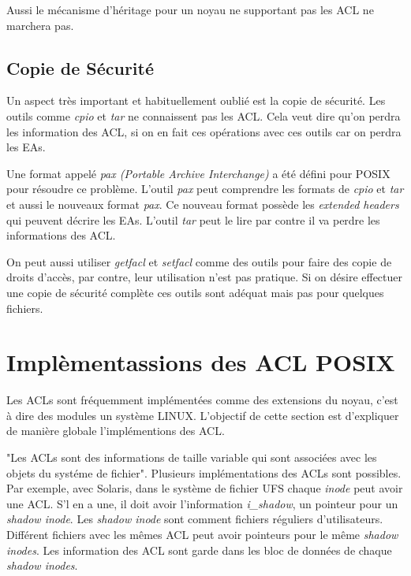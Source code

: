 \documentclass{article}
\begin{document}
Aussi le mécanisme d'héritage pour un noyau ne supportant pas les ACL ne marchera pas. 

\subsection{Copie de Sécurité}

Un aspect très important et habituellement oublié est la copie de sécurité. Les outils comme \emph{cpio} et \emph{tar} ne connaissent pas les ACL. Cela veut dire qu'on perdra les information des ACL, si on en fait ces opérations avec ces outils car on perdra les EAs.

Une format appelé \emph{pax (Portable Archive Interchange)} a été défini pour POSIX pour résoudre ce problème. L'outil \emph{pax} peut comprendre les formats de \emph{cpio} et \emph{tar} et aussi le nouveaux format \emph{pax}. Ce nouveau format possède les \emph{extended headers} qui peuvent décrire les EAs. L'outil \emph{tar} peut le lire par contre il va perdre les informations des ACL. 

On peut aussi utiliser \emph{getfacl} et \emph{setfacl} comme des outils pour faire des copie de droits d'accès, par contre, leur utilisation n'est pas pratique. Si on désire effectuer une copie de sécurité complète ces outils sont adéquat mais pas pour quelques fichiers. 

\section{Implèmentassions des ACL POSIX}
 
Les ACLs sont fréquemment implémentées comme des extensions du noyau, c'est à dire des modules un système LINUX. L'objectif de cette section est d'expliquer de manière globale l'implémentions des ACL. 
 
"Les ACLs sont des informations de taille variable qui sont associées avec les objets du systéme de fichier"\cite{aclsuse}. Plusieurs implémentations des ACLs sont possibles. Par exemple, avec Solaris, dans le système de fichier UFS\cite{acl_permission} chaque \emph{inode} peut avoir une ACL. S'l en a une, il doit avoir l'information \emph{i\_shadow}, un pointeur pour un \emph{shadow inode}. Les \emph{shadow inode} sont comment fichiers réguliers d'utilisateurs. Différent fichiers avec les mêmes ACL peut avoir pointeurs pour le même \emph{shadow inodes}. Les information des ACL sont garde dans les bloc de données de chaque \emph{shadow inodes}.
 
\end{document}
